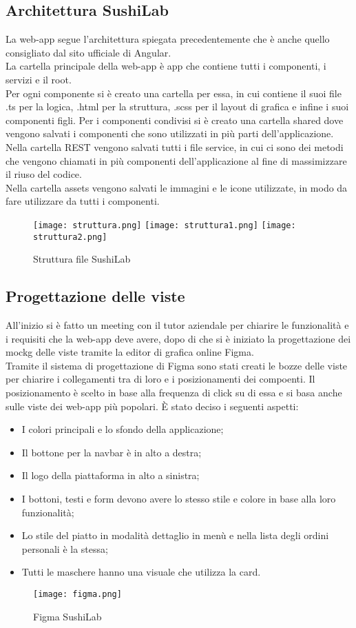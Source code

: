 \subsection{Architettura SushiLab}
La web-app segue l'architettura spiegata precedentemente che è anche quello consigliato dal sito ufficiale di Angular.\\
La cartella principale della web-app è app che contiene tutti i componenti, i servizi e il root.\\ 
Per ogni componente si è creato una cartella per essa, in cui contiene il suoi file .ts per la logica, .html per la struttura, .scss per il layout di grafica e infine i suoi componenti figli. Per i componenti condivisi si è creato una cartella shared dove vengono salvati i componenti che sono utilizzati in più parti dell'applicazione.\\
Nella cartella REST vengono salvati tutti i file service, in cui ci sono dei metodi che vengono chiamati in più componenti dell'applicazione al fine di massimizzare il riuso del codice.\\
Nella cartella assets vengono salvati le immagini e le icone utilizzate, in modo da fare utilizzare da tutti i componenti.\\
\begin{figure}[H]
    \centering
    \texttt{[image: struttura.png]}
    \texttt{[image: struttura1.png]}
    \texttt{[image: struttura2.png]}
    \caption{Struttura file SushiLab}
\end{figure}
\subsection{Progettazione delle viste}
All'inizio si è fatto un meeting con il tutor aziendale per chiarire le funzionalità e i requisiti che la web-app deve avere, dopo di che si è iniziato la progettazione dei \gls{mockg} delle viste tramite la editor di grafica online Figma.\\
Tramite il sistema di progettazione di Figma sono stati creati le bozze delle viste per chiarire i collegamenti tra di loro e i posizionamenti dei compoenti. 
Il posizionamento è scelto in base alla frequenza di click su di essa e si basa anche sulle viste dei web-app più popolari.
È stato deciso i seguenti aspetti:
\begin{itemize}
    \item I colori principali e lo sfondo della applicazione;
    \item Il bottone per la navbar è in alto a destra;
    \item Il logo della piattaforma in alto a sinistra;
    \item I bottoni, testi e form devono avere lo stesso stile e colore in base alla loro funzionalità;
    \item Lo stile del piatto in modalità dettaglio in menù e nella lista degli ordini personali è la stessa;
    \item Tutti le maschere hanno una visuale che utilizza la card.
\end{itemize}
\begin{figure}[H]
    \centering
    \texttt{[image: figma.png]}
    \caption{Figma SushiLab}
\end{figure}
